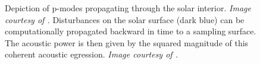 \documentclass[11pt,a4paper,onecolumn]{report}
\begin{document}
\begin{figure}[t]%
  \centering
  \qquad
  \caption[]{ Depiction of p-modes propagating through the
    solar interior. \textit{Image courtesy of \citet{Lindsey2017}.}
     Disturbances on the solar surface (dark blue) can be
    computationally propagated backward in time to a sampling surface. The
    acoustic power is then given by the squared magnitude of this coherent
    acoustic egression. \textit{Image courtesy of \citet{Lindsey2011}.}}
\end{figure}
\end{document}
